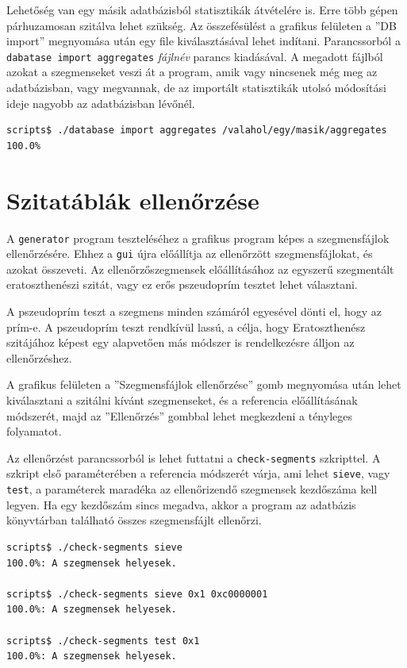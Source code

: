 Lehetőség van egy másik adatbázisból statisztikák átvételére is.
Erre több gépen párhuzamosan szitálva lehet szükség.
Az összefésülést a grafikus felületen a ''DB import'' megnyomása után egy file kiválasztásával lehet indítani.
Parancssorból a \texttt{dabatase import aggregates} \textit{fájlnév} parancs kiadásával.
A megadott fájlból azokat a szegmenseket veszi át a program, amik vagy nincsenek még meg az adatbázisban, vagy megvannak, de az importált statisztikák utolsó módosítási ideje nagyobb az adatbázisban lévőnél.

\begin{lstlisting}[language=bash]
scripts$ ./database import aggregates /valahol/egy/masik/aggregates
100.0%
\end{lstlisting}

\section{Szitatáblák ellenőrzése}

A \texttt{generator} program teszteléséhez a grafikus program képes a szegmensfájlok ellenőrzésére.
Ehhez a \texttt{gui} újra előállítja az ellenőrzött szegmensfájlokat, és azokat összeveti.
Az ellenőrzőszegmensek előállításához az egyszerű szegmentált eratoszthenészi szitát, vagy ez erős pszeudoprím tesztet lehet választani.

A pszeudoprím teszt a szegmens minden számáról egyesével dönti el, hogy az prím-e.
A pszeudoprím teszt rendkívül lassú, a célja, hogy Eratoszthenész szitájához képest egy alapvetően más módszer is rendelkezésre álljon az ellenőrzéshez.

A grafikus felületen a ''Szegmensfájlok ellenőrzése'' gomb megnyomása után lehet kiválasztani a szitálni kívánt szegmenseket, és a referencia előállításának módszerét, majd az ''Ellenőrzés'' gombbal lehet megkezdeni a tényleges folyamatot.

Az ellenőrzést parancssorból is lehet futtatni a \texttt{check-segments} szkripttel.
A szkript első paraméterében a referencia módszerét várja, ami lehet \texttt{sieve}, vagy \texttt{test}, a paraméterek maradéka az ellenőrizendő szegmensek kezdőszáma kell legyen.
Ha egy kezdőszám sincs megadva, akkor a program az adatbázis könyvtárban található összes szegmensfájlt ellenőrzi.

\begin{lstlisting}[language=bash]
scripts$ ./check-segments sieve
100.0%: A szegmensek helyesek.             

scripts$ ./check-segments sieve 0x1 0xc0000001
100.0%: A szegmensek helyesek.             

scripts$ ./check-segments test 0x1
100.0%: A szegmensek helyesek.             

\end{lstlisting}

